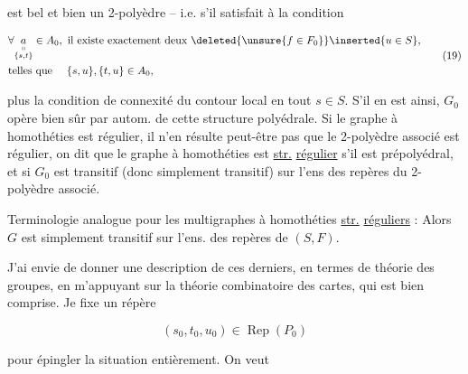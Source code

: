 
est bel et bien un 2-polyèdre -- i.e. s'il satisfait à la condition 

\[
\begin{aligned}
 &\forall \underset{\substack{\shortparallel\\\{s,t\}}}{a}\in A_0,\ \text{il existe exactement deux }\deleted{\unsure{f\in F_0}}\inserted{u\in S},\\
 &\text{telles que }\quad\{s,u\},\{t,u\}\in A_0,
\end{aligned}\tag*{(19)}
\]

plus la condition de connexité du contour local en tout $s\in S$. S'il en est ainsi, $G_0$ opère bien sûr par autom. de cette structure polyédrale. Si le graphe à homothéties est régulier, il  n'en résulte peut-être pas que le 2-polyèdre associé est régulier,  on dit que le graphe à homothéties est \uline{str.} \uline{régulier} s'il est prépolyédral, et si $G_0$ est transitif (donc simplement transitif) sur l'ens des repères du 2-polyèdre associé.


Terminologie analogue pour les multigraphes à homothéties \uline{str.} \uline{réguliers} : Alors $G$ est simplement transitif sur l'ens. des repères de $(S,F)$.

J'ai envie de donner une description de ces derniers, en termes de théorie des groupes, en m'appuyant sur la théorie combinatoire des cartes, qui est bien comprise. Je fixe un répère 

\[ (s_0,t_0,u_0)\in\operatorname{Rep}(P_0) \tag*{(20)} \]

pour épingler la situation entièrement.  On veut

